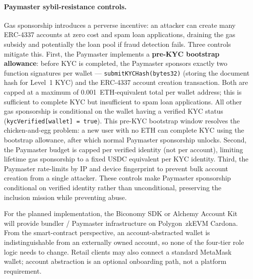 \documentclass[12pt,a4paper]{report}
\begin{document}
\paragraph{Paymaster sybil-resistance controls.}
Gas sponsorship introduces a perverse incentive: an attacker can create many ERC-4337 accounts at zero cost and spam loan applications, draining the gas subsidy and potentially the loan pool if fraud detection fails. Three controls mitigate this. First, the Paymaster implements a \textbf{pre-KYC bootstrap allowance}: before KYC is completed, the Paymaster sponsors exactly two function signatures per wallet --- \texttt{submitKYCHash(bytes32)} (storing the document hash for Level~1 KYC) and the ERC-4337 account creation transaction. Both are capped at a maximum of 0.001~ETH-equivalent total per wallet address; this is sufficient to complete KYC but insufficient to spam loan applications. All other gas sponsorship is conditional on the wallet having a verified KYC status (\texttt{kycVerified[wallet] = true}). This pre-KYC bootstrap window resolves the chicken-and-egg problem: a new user with no ETH can complete KYC using the bootstrap allowance, after which normal Paymaster sponsorship unlocks. Second, the Paymaster budget is capped per verified identity (not per account), limiting lifetime gas sponsorship to a fixed USDC equivalent per KYC identity. Third, the Paymaster rate-limits by IP and device fingerprint to prevent bulk account creation from a single attacker. These controls make Paymaster sponsorship conditional on verified identity rather than unconditional, preserving the inclusion mission while preventing abuse.

For the planned implementation, the Biconomy SDK or Alchemy Account Kit will provide bundler / Paymaster infrastructure on Polygon~zkEVM Cardona. From the smart-contract perspective, an account-abstracted wallet is indistinguishable from an externally owned account, so none of the four-tier role logic needs to change. Retail clients may also connect a standard MetaMask wallet; account abstraction is an optional onboarding path, not a platform requirement.
\end{document}

